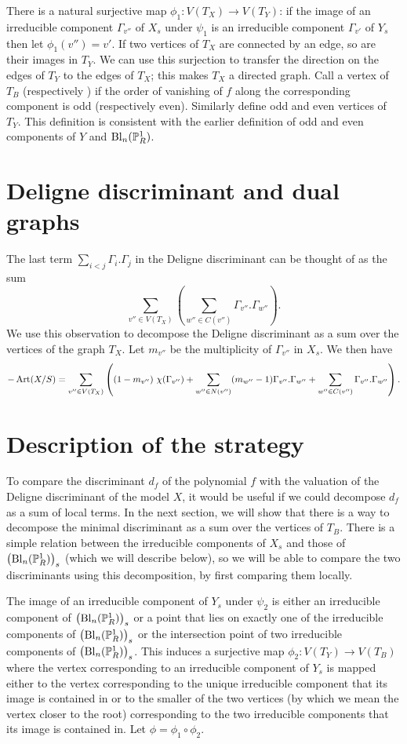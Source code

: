 There is a natural surjective map $\phi_1: V(T_X) \rightarrow V(T_Y)$: if the image of an irreducible component $\Gamma_{v''}$ of $X_s$ under $\psi_1$ is an irreducible component $\Gamma_{v'}$ of $Y_s$ then let $\phi_1(v'') = v'$. If two vertices of $T_X$ are connected by an edge, so are their images in $T_Y$. We can use this surjection to transfer the direction on the edges of $T_Y$ to the edges of $T_X$; this makes $T_X$ a directed graph. Call a vertex of $T_B$ {\color{blue}{odd}} (respectively {\color{blue}{even}}) if the order of vanishing of $f$ along the corresponding component is odd (respectively even). Similarly define odd and even vertices of $T_Y$. This definition is consistent with the earlier definition of odd and even components of $Y$ and $\mathrm{Bl}_n(\P^1_R)$.

\section{Deligne discriminant and dual graphs}\label{DDanddual}
The last term $\sum_{i < j} \Gamma_i.\Gamma_j$ in the Deligne discriminant can be thought of as the sum 
\[ \sum_{v'' \in V(T_X)} \left( \sum_{w'' \in C(v'')} \Gamma_{v''}.\Gamma_{w''} \right) .\]
We use this observation to decompose the Deligne discriminant as a sum over the vertices of the graph $T_X$. Let $m_{v''}$ be the multiplicity of $\Gamma_{v''}$ in $X_s$. We then have
\[ -\Art (X/S) = \sum_{v'' \in V(T_X)} \left( (1-m_{v''})\ \chi(\Gamma_{v''}) + \sum_{w'' \in N(v'')} (m_{w''} - 1) \Gamma_{v''}.\Gamma_{w''} + \sum_{w'' \in C(v'')} \Gamma_{v''}.\Gamma_{w''} \right) .\]

\section{Description of the strategy}\label{description}
To compare the discriminant $d_f$ of the polynomial $f$ with the valuation of the Deligne discriminant of the model $X$, it would be useful if we could decompose $d_f$ as a sum of local terms. In the next section, we will show that there is a way to decompose the minimal discriminant as a sum over the vertices of $T_B$. There is a simple relation between the irreducible components of $X_s$ and those of $\left( \mathrm{Bl}_n(\P^1_R) \right)_s$ (which we will describe below), so we will be able to compare the two discriminants using this decomposition, by first comparing them locally. 

The image of an irreducible component of $Y_s$ under $\psi_2$ is either an irreducible component of $\left(\mathrm{Bl}_n(\P^1_R) \right)_s$ or a point that lies on exactly one of the irreducible components of $\left(\mathrm{Bl}_n(\P^1_R) \right)_s$ or the intersection point of two irreducible components of $\left(\mathrm{Bl}_n(\P^1_R) \right)_s$.  This induces a surjective map $\phi_2: V(T_Y) \rightarrow V(T_B)$ where the vertex corresponding to an irreducible component of $Y_s$ is mapped either to the vertex corresponding to the unique irreducible component that its image is contained in or to the smaller of the two vertices (by which we mean the vertex closer to the root) corresponding to the two irreducible components that its image is contained in. Let $\phi = \phi_1 \circ \phi_2$.

